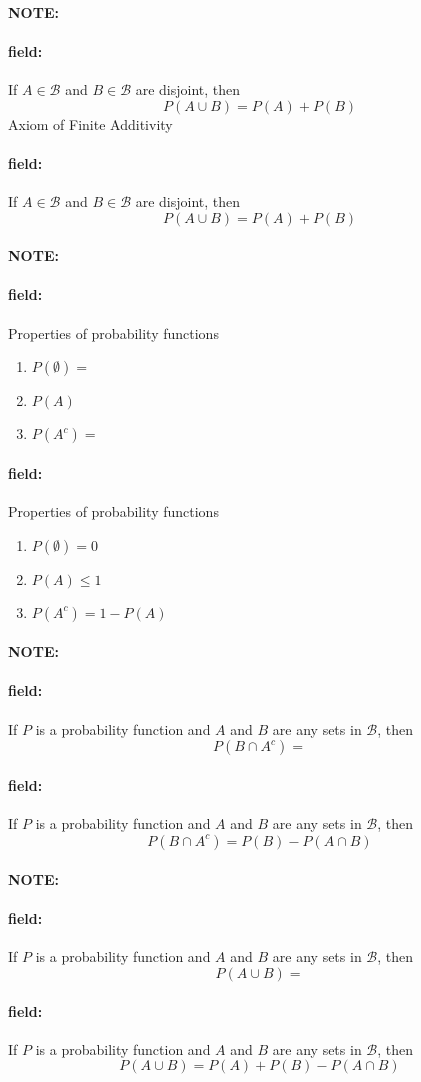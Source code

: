\documentclass[12pt]{article}
\newenvironment{note}{\paragraph{NOTE:}}{}
\newenvironment{field}{\paragraph{field:}}{}
\begin{document}
\begin{note}
    \begin{field}
      If $A\in \mathcal{B}$ and $B \in \mathcal{B}$ are disjoint, then
          $$P(A\cup B) = P(A) + P(B) $$
        Axiom of Finite Additivity
    \end{field}
    \begin{field}
        If $A\in \mathcal{B}$ and $B \in \mathcal{B}$ are disjoint, then
            $$P(A\cup B) = P(A) + P(B) $$
    \end{field}
\end{note}

\begin{note}
    \begin{field}
        Properties of probability functions
        \begin{enumerate}
              \item $P(\emptyset) = $
              \item $P(A) $
              \item $P(A^c) = $
            \end{enumerate}
    \end{field}
    \begin{field}
      Properties of probability functions
        \begin{enumerate}
              \item $P(\emptyset) = 0$
              \item $P(A) \leq 1$
              \item $P(A^c) = 1 - P(A)$
            \end{enumerate}
    \end{field}
\end{note}

\begin{note}
    \begin{field}
        If $P$ is a probability function and $A$ and $B$ are any sets in $\mathcal{B}$, then $$P(B\cap A^c) = $$
    \end{field}
    \begin{field}
        If $P$ is a probability function and $A$ and $B$ are any sets in $\mathcal{B}$, then $$P(B\cap A^c) = P(B) - P(A \cap B)$$
    \end{field}
\end{note}

\begin{note}
    \begin{field}
        If $P$ is a probability function and $A$ and $B$ are any sets in $\mathcal{B}$, then $$P(A\cup B) = $$
    \end{field}
    \begin{field}
        If $P$ is a probability function and $A$ and $B$ are any sets in $\mathcal{B}$, then $$P(A\cup B) = P(A) + P(B) - P(A \cap B)$$
    \end{field}
\end{note}
\end{document}
